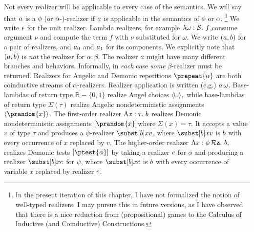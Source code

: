 \documentclass[12pt]{cmuthesis}
\theoremstyle{definition}
\theoremstyle{remark}
\newcommand{\om}{\omega}
\begin{document}
Not every realizer will be applicable to every case of the semantics.
We will say that $\aa$ is a $\phi$ (or $\alpha$-)-realizer if $\aa$ is applicable in the semantics of $\phi$ or $\alpha$.
\footnote{
In the present iteration of this chapter, I have not formalized the notion of well-typed realizers.
I may pursue this in future versions, as I have observed that there is a nice reduction from (propositional) games to the Calculus of Inductive (and Coinductive) Constructions.
}
We write $\rzNil$ for the unit realizer.
Lambda realizers, for example  $\rzBLam{\om}{f}$,consume argument $\nu$ and compute the term $f$ with $\nu$ substituted for $\om$.
We write $\rzCons{\aa}{\ab}$ for a pair of realizers, and $\rzFst{\aa}$ and $\rzSnd{\aa}$ for its components.
We explicitly note that $\rzCons{\aa}{\ab}$ is \emph{not} the realizer for $\alpha;\beta$.
The realizer $\aa$ might have many different branches and behaviors.
Informally, in \emph{each} case \emph{some} $\beta$-realizer must be returned.
Realizers for Angelic and Demonic repetitions $\prepeat{\alpha}$ are both coinductive streams of $\alpha$-realizers.
Realizer application is written (e.g.) $\rzApp{\aa}{\om}$.
Base-lambdas of return type $\mathbb{B} \equiv \{0,1\}$ realize Angel choices $\langle{\cup}\rangle,$ while base-lambdas of return type $\Sigma(\tau)$ realize Angelic nondeterministic assignments $\langle\prandom{x}\rangle$.
The first-order realizer $\rzFOLam{x}{\tau}{\ab}$ realizes Demonic nondeterministic assignments $[\prandom{x}]$where $\Sigma(x) = \tau$.
It accepts a value $v$ of type $\tau$ and produces a $\psi$-realizer $\tsub{\ab}{x}{v}$, where $\tsub{\ab}{x}{v}$ is $\ab$ with every occurrence of $x$ replaced by $v$.
The higher-order realizer $\rzHOLam{x}{\phi}{\ab},$ realizes Demonic tests  $[\ptest{\phi}]$ by taking a realizer $\ac$ for $\phi$ and producing a realizer $\tsub{\ab}{x}{\ac}$ for $\psi$, where $\tsub{\ab}{x}{\ac}$ is $\ab$ with every occurrence of variable $x$ replaced by realizer $\ac$.
\end{document}
